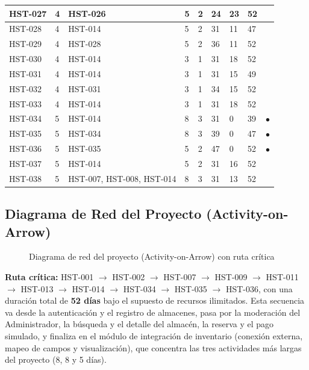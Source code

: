 {\begin{longtable}{|M{1.9cm}|M{1.3cm}|M{1.6cm}|M{1.3cm}|M{1.7cm}|M{1.1cm}|M{1.7cm}|M{1.1cm}|M{1.0cm}|}
HST-027 & 4 & HST-026 & 5 & 2 & 24 & 23 & 52 & \\ \hline
HST-028 & 4 & HST-014 & 5 & 2 & 31 & 11 & 47 & \\ \hline
HST-029 & 4 & HST-028 & 5 & 2 & 36 & 11 & 52 & \\ \hline
HST-030 & 4 & HST-014 & 3 & 1 & 31 & 18 & 52 & \\ \hline
HST-031 & 4 & HST-014 & 3 & 1 & 31 & 15 & 49 & \\ \hline
HST-032 & 4 & HST-031 & 3 & 1 & 34 & 15 & 52 & \\ \hline
HST-033 & 4 & HST-014 & 3 & 1 & 31 & 18 & 52 & \\ \hline
HST-034 & 5 & HST-014 & 8 & 3 & 31 & 0 & 39 & $\bullet$ \\ \hline
HST-035 & 5 & HST-034 & 8 & 3 & 39 & 0 & 47 & $\bullet$ \\ \hline
HST-036 & 5 & HST-035 & 5 & 2 & 47 & 0 & 52 & $\bullet$ \\ \hline
HST-037 & 5 & HST-014 & 5 & 2 & 31 & 16 & 52 & \\ \hline
HST-038 & 5 & HST-007, HST-008, HST-014 & 8 & 3 & 31 & 13 & 52 & \\ \hline
\end{longtable}
}

\subsection{Diagrama de Red del Proyecto (Activity-on-Arrow)}
\begin{figure}[H]
    \centering
    \caption{Diagrama de red del proyecto (Activity-on-Arrow) con ruta crítica}
    \label{fig:aoa}
\end{figure}
\noindent\textbf{Ruta crítica:} HST-001 $\rightarrow$ HST-002 $\rightarrow$ HST-007 $\rightarrow$ HST-009 $\rightarrow$ HST-011 $\rightarrow$ HST-013 $\rightarrow$ HST-014 $\rightarrow$ HST-034 $\rightarrow$ HST-035 $\rightarrow$ HST-036, con una duración total de \textbf{52 días} bajo el supuesto de recursos ilimitados. Esta secuencia va desde la autenticación y el registro de almacenes, pasa por la moderación del Administrador, la búsqueda y el detalle del almacén, la reserva y el pago simulado, y finaliza en el módulo de integración de inventario (conexión externa, mapeo de campos y visualización), que concentra las tres actividades más largas del proyecto (8, 8 y 5 días).

